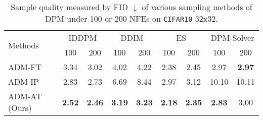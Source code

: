 \begin{table*}[t!]
\centering
\caption{Sample quality measured by FID $\downarrow$ of various sampling methods of DPM under 100 or 200 NFEs on \texttt{CIFAR10} 32x32.}
\begin{tabular}{lcccccccc}
\toprule
    \multirow{2}{*}{Methods} & \multicolumn{2}{c}{IDDPM} & \multicolumn{2}{c}{DDIM} & \multicolumn{2}{c}{ES} & \multicolumn{2}{c}{DPM-Solver}\\ 
    & 100 & 200 & 100 & 200 & 100 & 200 & 100 & 200 \\
    \midrule
    ADM-FT & 3.34 & 3.02 & 4.02 & 4.22 & 2.38 & 2.45 & 2.97 & \bf 2.97 \\
    ADM-IP & 2.83 & 2.73 & 6.69 & 8.44 & 2.97 & 3.12 & 10.10 & 10.11 \\
    ADM-AT (Ours) & \bf 2.52 & \bf 2.46 & \bf 3.19 & \bf 3.23 & \bf 2.18 & \bf 2.35 & \bf 2.83 & 3.00\\
    \bottomrule
    \end{tabular}
\label{tab:c10_more_nfe}
\end{table*}

